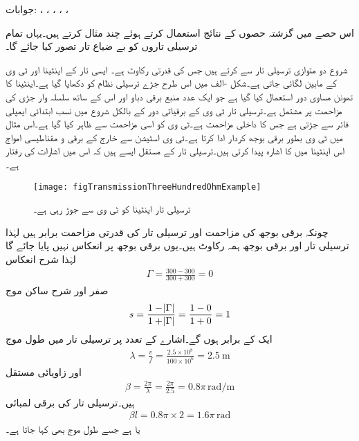 جوابات: ، ، ، ، ، 

اس حصے میں گزشتہ حصوں کے نتائج استعمال کرتے ہوئے چند مثال کرتے ہیں۔یہاں تمام ترسیلی تاروں کو بے ضیاع تار تصور کیا جائے گا۔

شروع دو متوازی ترسیلی تار سے کرتے ہیں جس کی قدرتی رکاوٹ  ہے۔ ایسی تار  کے اینٹینا اور ٹی وی کے مابین لگائی جاتی ہے۔شکل -الف میں اس طرح جڑے ترسیلی نظام کو دکھایا گیا ہے۔اینٹینا کا تھونن مساوی دور استعمال کیا گیا ہے جو ایک عدد منبع برقی دباو  اور اس کے ساتھ سلسلہ وار  جڑی  کی مزاحمت پر مشتمل ہے۔ترسیلی تار ٹی وی کے برقیاتی دور کے بالکل شروع میں نسب ابتدائی ایمپلی فائر سے جڑتی ہے جس کا داخلی مزاحمت  ہے۔ٹی وی کو اسی مزاحمت سے ظاہر کیا گیا ہے۔اس مثال میں ٹی وی بطور برقی بوجھ کردار ادا کرتا ہے۔ٹی وی اسٹیشن سے خارج  کے برقی و مقناطیسی امواج اس اینٹینا میں  کا اشارہ پیدا کرتی ہیں۔ترسیلی تار کے مستقل ایسے ہیں کہ اس میں اشارات کی رفتار  ہے۔

\begin{figure}
\centering
\texttt{[image: figTransmissionThreeHundredOhmExample]}
\caption{ترسیلی تار اینٹینا کو ٹی وی سے جوڑ رہی ہے۔}
\label{شکل_ترسیلی_اینٹینا_تا_ٹی_وی}
\end{figure}

چونکہ برقی بوجھ کی مزاحمت اور ترسیلی تار کی قدرتی مزاحمت برابر ہیں لہٰذا ترسیلی تار اور برقی بوجھ ہمہ رکاوٹ ہیں۔یوں برقی بوجھ پر انعکاس نہیں پایا جائے گا لہٰذا شرح انعکاس
\begin{align*}
\Gamma=\frac{300-300}{300+300}=0
\end{align*}
 صفر اور شرح ساکن موج
\begin{align*}
s=\frac{1-\abs{\Gamma}}{1+\abs{\Gamma}}=\frac{1-0}{1+0}=1
\end{align*}
ایک کے برابر ہوں گے۔اشارے کے تعدد پر ترسیلی تار میں طول موج
\begin{align*}
\lambda=\frac{v}{f}=\frac{2.5 \times 10^8}{100\times 10^6}=\SI{2.5}{\meter}
\end{align*}
اور زاویائی مستقل
\begin{align*}
\beta=\frac{2\pi}{\lambda}=\frac{2\pi}{2.5}=0.8 \pi\, \si{\radian \per \meter}
\end{align*}
 ہیں۔ترسیلی تار کی برقی لمبائی
\begin{align*}
\beta l =0.8 \pi \times 2=1.6 \pi \, \si{\radian}
\end{align*} 
یا  ہے جسے  طول موج بھی کہا جاتا ہے۔ 

